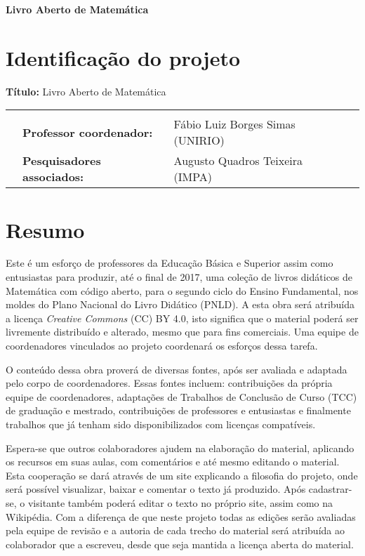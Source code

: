 \documentclass[10 pt]{article}
\begin{document}


\begin{center}
  {\large{\bf   Livro Aberto de Matemática}}
\end{center}


\section{Identificação do projeto}
\textbf{T\'itulo:} Livro Aberto de Matemática

\begin{flushright}
  \noindent
  \begin{tabular}{llll}
    &&\\
    &\textbf{Professor coordenador:}& Fábio Luiz Borges Simas (UNIRIO)\\
    &\textbf{Pesquisadores associados:}& Augusto Quadros Teixeira (IMPA)
  \end{tabular}
\end{flushright}
\vspace{0.3cm}


\section{Resumo}

Este é um esforço de professores da Educação Básica e Superior assim como entusiastas para produzir, até o final de 2017, uma coleção de livros didáticos de Matemática com código aberto, para o segundo ciclo do Ensino Fundamental, nos moldes do Plano Nacional do Livro Didático (PNLD).
A esta obra será atribuída a licença {\it Creative Commons} (CC) BY 4.0, isto significa que o material poderá ser livremente distribuído e alterado, mesmo que para fins comerciais.
Uma equipe de coordenadores vinculados ao projeto coordenará os esforços dessa tarefa.

O conteúdo dessa obra proverá de diversas fontes, após ser avaliada e adaptada pelo corpo de coordenadores.
Essas fontes incluem: contribuições da própria equipe de coordenadores, adaptações de Trabalhos de Conclusão de Curso (TCC) de graduação e mestrado, contribuições de professores e entusiastas e finalmente trabalhos que já tenham sido disponibilizados com licenças compatíveis.

Espera-se que outros colaboradores ajudem na elaboração do material, aplicando os recursos em suas aulas, com comentários e até mesmo editando o material.
Esta cooperação se dará através de um site explicando a filosofia do projeto, onde será possível visualizar, baixar e comentar o texto já produzido.
Após cadastrar-se, o visitante também poderá editar o texto no próprio site, assim como na Wikipédia.
Com a diferença de que neste projeto todas as edições serão avaliadas pela equipe de revisão e a autoria de cada trecho do material será atribuída ao colaborador que a escreveu, desde que seja mantida a licença aberta do material.
\end{document}
